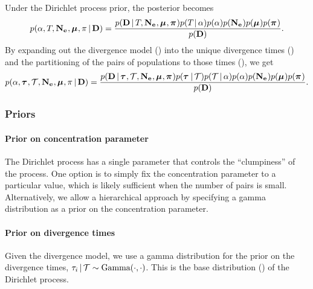 Under the Dirichlet process prior, the posterior becomes
\begin{equation}
    \pr(
    \concentration,
    \divtimemodel,
    \collectionpopsizes,
    \murates,
    \gfreq
    \given
    \alldata
    )
    =
    \frac{
        \pr(
        \alldata
        \given
        \divtimemodel,
        \collectionpopsizes,
        \murates,
        \gfreqs
        )
        \pr(\divtimemodel \given \concentration)
        \pr(\concentration)
        \pr(\collectionpopsizes)
        \pr(\murates)
        \pr(\gfreqs)
    }{
        \pr(
        \alldata
        )
    }.
    \label{eq:bayesrule}
\end{equation}
By expanding out the divergence model (\divtimemodel) into the
unique divergence times (\divtimes) and the partitioning of the pairs of populations
to those times (\divtimesets), we get
\begin{equation}
    \pr(
    \concentration,
    \divtimes,
    \divtimesets,
    \collectionpopsizes,
    \murates,
    \gfreq
    \given
    \alldata
    )
    =
    \frac{
        \pr(
        \alldata
        \given
        \divtimes,
        \divtimesets,
        \collectionpopsizes,
        \murates,
        \gfreqs
        )
        \pr(\divtimes \given \divtimesets)
        \pr(\divtimesets \given \concentration)
        \pr(\concentration)
        \pr(\collectionpopsizes)
        \pr(\murates)
        \pr(\gfreqs)
    }{
        \pr(
        \alldata
        )
    }.
    \label{eq:bayesruleexpanded}
\end{equation}

\subsubsection{Priors}

\paragraph{Prior on concentration parameter}
The Dirichlet process has a single parameter \concentration that controls the
``clumpiness'' of the process.
One option is to simply fix the concentration parameter to a particular value,
which is likely sufficient when the number of pairs is small.
Alternatively, we allow a hierarchical approach by specifying a gamma
distribution as a prior on the concentration parameter.

\paragraph{Prior on divergence times}
Given the divergence model, we use a gamma distribution for the prior on the
divergence times,
$\divtime[i] \given \divtimesets \sim \distgamma(\cdot, \cdot)$.
This is the base distribution (\basedistribution) of the Dirichlet process.


